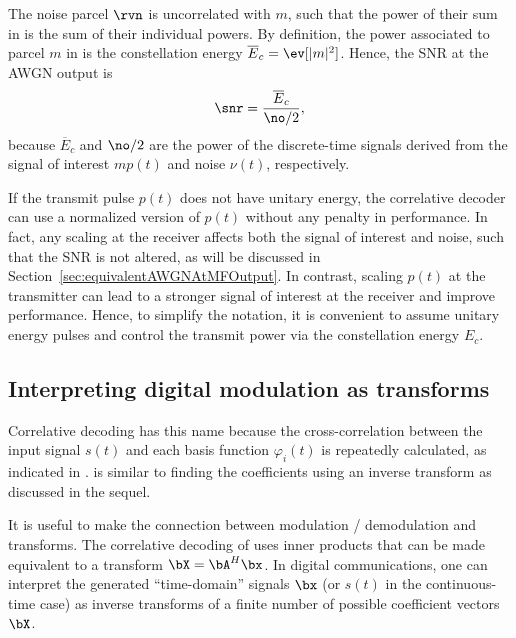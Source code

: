 The noise parcel $\rvn$ is uncorrelated with $m$, such that the power of their sum in
 is the sum of their individual powers.
By definition, the power associated to parcel $m$ in  is the 
constellation energy $\overline E_c = \ev[|m|^2]$. Hence, the SNR at the AWGN output is
\begin{equation}
\snr = \frac{\overline E_c}{\no/2},
\end{equation}
because $\overline E_c$ and $\no/2$ are the power of the discrete-time signals
derived from the signal of interest $mp(t)$ and noise $\nu(t)$, respectively.

If the transmit pulse $p(t)$ does not have unitary energy, the correlative decoder can
use a normalized version of $p(t)$ without any penalty in performance. In fact, any
scaling at the receiver affects both the signal of interest and noise, such that the SNR
is not altered, as will be discussed in Section~\ref{sec:equivalentAWGNAtMFOutput}. In contrast, scaling $p(t)$ at the transmitter can lead to a stronger
signal of interest at the receiver and improve performance. Hence, to simplify the notation,
it is convenient to assume unitary energy pulses and control the transmit power via
the constellation energy $E_c$.

\subsection{Interpreting digital modulation as transforms}
\label{sec:InterpretingDigitalModulation}

Correlative decoding has this name because the cross-correlation between the input signal $s(t)$ and each basis function $\varphi_i(t)$ is repeatedly calculated, as indicated in . is similar to finding the coefficients using an inverse transform as discussed in the sequel.

It is useful to make the connection between modulation / demodulation and transforms. 
The correlative decoding of  uses inner products that can be made equivalent to a transform $\bX = \bA^H \bx$. In digital communications, one can interpret the generated ``time-domain'' signals $\bx$ (or $s(t)$ in the continuous-time case) as inverse transforms of a finite number of possible coefficient vectors $\bX$. 

